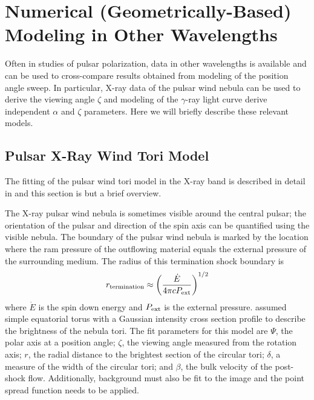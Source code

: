 \section{Numerical (Geometrically-Based) Modeling in Other Wavelengths}
\label{sec:ModelingOtherWavelengths}
Often in studies of pulsar polarization, data in other wavelengths is available
and can be used to cross-compare results obtained from modeling
of the position angle sweep.
In particular, X-ray data of the pulsar wind nebula can 
be used to derive the viewing angle $\zeta$ and
modeling of the $\gamma$-ray light curve derive independent
$\alpha$ and $\zeta$ parameters.  Here we will 
briefly describe these relevant models.

\subsection{Pulsar X-Ray Wind Tori Model} 
\label{subsec:ToriModeling}
The fitting of the pulsar wind tori model in the X-ray band is described in
detail in \cite{ng2004fitting} and this section is but a 
brief overview.  

The X-ray pulsar wind nebula is sometimes visible around
the central pulsar; the orientation of the pulsar and direction of
the spin axis can be 
quantified using the visible nebula.  
The boundary of the pulsar wind nebula is marked by
the location where the ram pressure of the outflowing material equals
the external pressure of the surrounding medium.
The radius of this termination shock boundary is
\begin{equation}
r_{\rm termination}\approx \left(\frac{\dot{E}}{4\pi c P_{\rm ext}} \right)^{1/2}
\end{equation}
where $\dot{E}$ is the spin down energy and $P_{\rm ext}$ is the
external pressure.
\cite{ng2004fitting} assumed simple equatorial
torus with a Gaussian intensity cross section profile
to describe the brightness of the nebula tori.
The fit parameters for this model are $\Psi$, the polar
axis at a position angle; $\zeta$, the viewing angle measured
from the rotation axis; $r$, the radial distance
to the brightest section of the circular tori; $\delta$,
a measure of the width of the circular tori; and $\beta$,
the bulk velocity of the post-shock flow.
Additionally, background must also be fit to 
the image and the point spread function needs to
be applied.

